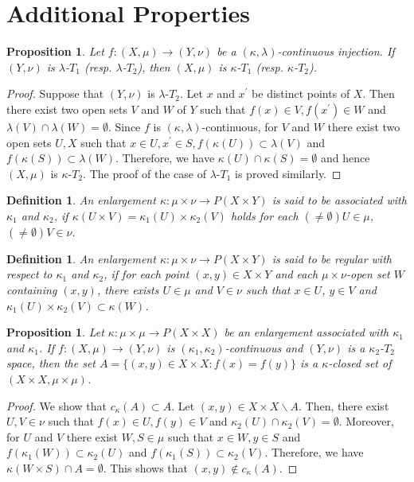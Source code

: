 \documentclass{matua}
\newtheorem{definition}[theorem]{Definition}
\newtheorem{proposition}[theorem]{Proposition}
\begin{document}
\section{Additional Properties}


\begin{proposition}
Let $f:(X, \mu)\rightarrow (Y, \nu)$ be a $(\kappa, \lambda)$-continuous injection. If $(Y, \nu)$ is $\lambda$-$T_1$ (resp. $\lambda$-$T_2$), then $(X, \mu)$ is $\kappa$-$T_1$ (resp. $\kappa$-$T_2$).
\end{proposition}
\begin{proof}
Suppose that $(Y, \nu)$ is $\lambda$-$T_2$. Let $x$ and $x^{'}$ be distinct points of $X$. Then there exist two open sets $V$ and $W$ of $Y$ such that $f(x)\in V, f(x^{'})\in W$ and $\lambda(V)\cap \lambda(W)=\emptyset$. Since $f$ is $(\kappa, \lambda)$-continuous, for $V$ and $W$ there exist two open sets $U, X$ such that $x\in U, x^{'}\in S, f(\kappa(U))\subset \lambda(V)$ and $f(\kappa(S))\subset \lambda(W)$. Therefore, we have $\kappa(U)\cap \kappa(S)=\emptyset$ and hence $(X, \mu)$ is $\kappa$-$T_2$. The proof of the case of $\lambda$-$T_1$ is proved similarly.
\end{proof}
\begin{definition}
An enlargement $\kappa:\mu\times \nu\rightarrow P(X\times Y)$ is said to be associated with $\kappa_1$ and $\kappa_2$, if $\kappa(U\times V)= \kappa_1(U)\times \kappa_2(V)$ holds for each $(\neq \emptyset) U\in \mu$, $(\neq \emptyset)V\in \nu$.
\end{definition}
\begin{definition}
An enlargement $\kappa:\mu\times \nu\rightarrow P(X\times Y)$ is said to be regular with respect to $\kappa_1$ and $\kappa_2$, if for each point $(x, y)\in X\times Y$ and each $\mu\times \nu$-open set $W$ containing $(x, y)$, there exists $U\in \mu$ and $V\in \nu$ such that $x\in U$, $y\in V$ and $\kappa_1(U)\times \kappa_2(V)\subset \kappa(W)$.
\end{definition}
\begin{proposition}\label{p5.2}
Let $\kappa:\mu\times \mu\rightarrow P(X\times X)$ be an enlargement associated  with $\kappa_1$ and $\kappa_1$. If $f:(X, \mu)\rightarrow (Y, \nu)$ is $(\kappa_1, \kappa_2)$-continuous and $(Y, \nu)$ is a $\kappa_2$-$T_2$ space, then the set $A=\{(x, y)\in X\times X: f(x)=f(y)\}$ is a $\kappa$-closed set of $(X\times X, \mu\times \mu)$.
\end{proposition}
\begin{proof}
We show that $c_{\kappa}(A)\subset A$. Let $(x, y)\in X\times X\backslash A$. Then, there exist $U, V \in \nu$ such that $f(x)\in U, f(y)\in V$ and $\kappa_2(U)\cap \kappa_2(V)=\emptyset$. Moreover, for $U$ and $V$ there exist $W, S\in \mu$ such that $x\in W, y\in S$ and $f(\kappa_1(W))\subset \kappa_2(U)$ and $f(\kappa_1(S))\subset \kappa_2(V)$. Therefore, we have $\kappa(W\times S)\cap A=\emptyset$. This shows that $(x, y)\notin c_{\kappa}(A)$.
\end{proof}
\end{document}
